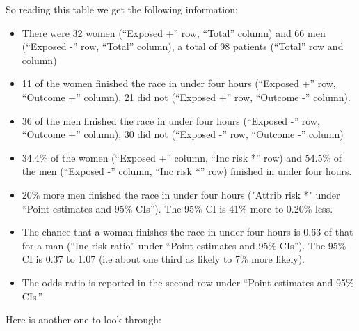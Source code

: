 \documentclass[]{book}
\newenvironment{Shaded}{\begin{snugshade}}{\end{snugshade}}
\newcommand{\DataTypeTok}[1]{\textcolor[rgb]{0.13,0.29,0.53}{#1}}
\newcommand{\DecValTok}[1]{\textcolor[rgb]{0.00,0.00,0.81}{#1}}
\newcommand{\KeywordTok}[1]{\textcolor[rgb]{0.13,0.29,0.53}{\textbf{#1}}}
\newcommand{\NormalTok}[1]{#1}
\newcommand{\OperatorTok}[1]{\textcolor[rgb]{0.81,0.36,0.00}{\textbf{#1}}}
\providecommand{\tightlist}{%
  \setlength{\itemsep}{0pt}\setlength{\parskip}{0pt}}
\begin{document}
So reading this table we get the following information:

\begin{itemize}
\tightlist
\item
  There were 32 women (``Exposed +'' row, ``Total'' column) and 66 men (``Exposed -'' row, ``Total'' column), a total of 98 patients (``Total'' row and column)
\item
  11 of the women finished the race in under four hours (``Exposed +'' row, ``Outcome +'' column), 21 did not (``Exposed +'' row, ``Outcome -'' column).
\item
  36 of the men finished the race in under four hours (``Exposed -'' row, ``Outcome +'' column), 30 did not (``Exposed -'' row, ``Outcome -'' column)
\item
  34.4\% of the women (``Exposed +'' column, ``Inc risk *'' row) and 54.5\% of the men (``Exposed -'' column, ``Inc risk *'' row) finished in under four hours.
\item
  20\% more men finished the race in under four hours ("Attrib risk *" under ``Point estimates and 95\% CIs''). The 95\% CI is 41\% more to 0.20\% less.
\item
  The chance that a woman finishes the race in under four hours is 0.63 of that for a man (``Inc risk ratio'' under ``Point estimates and 95\% CIs''). The 95\% CI is 0.37 to 1.07 (i.e about one third as likely to 7\% more likely).
\item
  The odds ratio is reported in the second row under ``Point estimates and 95\% CIs.''
\end{itemize}

Here is another one to look through:

\begin{Shaded}
\end{Shaded}
\end{document}
